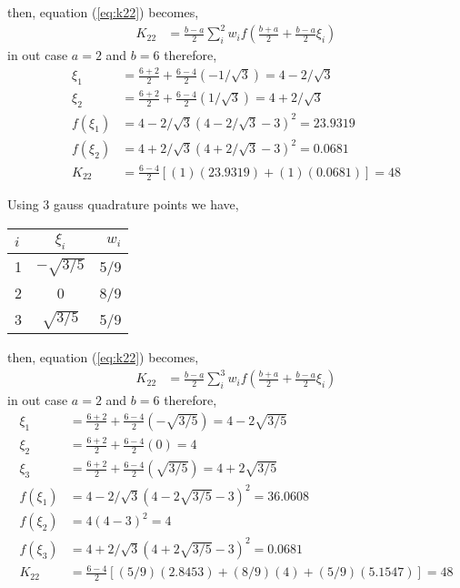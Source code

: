 \documentclass[a4paper]{memoir}
\begin{document}
then, equation (\ref{eq:k22}) becomes, 
\begin{align*}
	K_{22} &= \frac{b-a}{2} \sum_i^2 w_i f(\frac{b+a}{2}+\frac{b-a}{2}\xi_i)
\end{align*}
in out case $a=2$ and $b=6$ therefore, 
\begin{align*}
	\xi_1 &= \frac{6+2}{2}+\frac{6-4}{2}(-1/ \sqrt{3}) = 4-2/\sqrt{3} \\
	\xi_2 &= \frac{6+2}{2}+\frac{6-4}{2}(1/ \sqrt{3}) = 4+2/\sqrt{3} \\
	f(\xi_1) &= 4-2/\sqrt{3}(4-2/\sqrt{3}-3)^2 = 23.9319 \\
	f(\xi_2) &= 4+2/\sqrt{3}(4+2/\sqrt{3}-3)^2 = 0.0681 \\
	K_{22} &= \frac{6-4}{2} \left[ (1)(23.9319) + (1)(0.0681) \right] = 48
\end{align*}

Using 3 gauss quadrature points we have, \\

\begin{center}
	\begin{tabular}{l | c | r}
		\hline
		$i$ & 	$\xi_i$ 		&	$w_i$ \\ \hline
		1 	& $-\sqrt{3/5}$	&	5/9		\\ \hline
		2 	& 0							&	8/9		\\ \hline
		3 	& $\sqrt{3/5}$	&	5/9
	\end{tabular}
\end{center} 

then, equation (\ref{eq:k22}) becomes, 
\begin{align*}
	K_{22} &= \frac{b-a}{2} \sum_i^3 w_i f(\frac{b+a}{2}+\frac{b-a}{2}\xi_i)
\end{align*}
in out case $a=2$ and $b=6$ therefore, 
\begin{align*}
	\xi_1 &= \frac{6+2}{2}+\frac{6-4}{2}(-\sqrt{3/5}) = 4-2\sqrt{3/5} \\
	\xi_2 &= \frac{6+2}{2}+\frac{6-4}{2}(0) = 4 \\
	\xi_3 &= \frac{6+2}{2}+\frac{6-4}{2}(\sqrt{3/5}) = 4+2\sqrt{3/5} \\
	f(\xi_1) &= 4-2/\sqrt{3}(4-2\sqrt{3/5}-3)^2 = 36.0608 \\
	f(\xi_2) &= 4(4-3)^2 = 4 \\
	f(\xi_3) &= 4+2/\sqrt{3}(4+2\sqrt{3/5}-3)^2 = 0.0681 \\
	K_{22} &= \frac{6-4}{2} \left[ (5/9)(2.8453) + (8/9)(4) + (5/9)(5.1547) \right] = 48
\end{align*}
\end{document}
